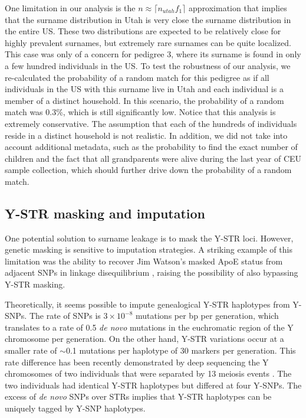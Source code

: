 One limitation in our analysis is the $n \approx \lceil n_{utah} f_1 \rceil$ approximation that implies that the surname distribution in Utah is very close the surname distribution in the entire US. These two distributions are expected to be relatively close for highly prevalent surnames, but extremely rare surnames can be quite localized. This case was only of a concern for pedigree 3, where its surname is found in only a few hundred individuals in the US. To test the robustness of our analysis, we re-calculated the probability of a random match for this pedigree as if all individuals in the US with this surname live in Utah and each individual is a member of a distinct household. In this scenario, the probability of a random match was 0.3\%, which is still significantly low. Notice that this analysis is extremely conservative. The assumption that each of the hundreds of individuals reside in a distinct household is not realistic. In addition, we did not take into account additional metadata, such as the probability to find the exact number of children and the fact that all grandparents were alive during the last year of CEU sample collection, which should further drive down the probability of a random match.

\subsection{Y-STR masking and imputation}
One potential solution to surname leakage is to mask the Y-STR loci. However, genetic masking is sensitive to imputation strategies. A striking example of this limitation was the ability to recover Jim Watson's masked ApoE status from adjacent SNPs in linkage disequilibrium \cite{NyholtYuVisscher2009}, raising the possibility of also bypassing Y-STR masking.

Theoretically, it seems possible to impute genealogical Y-STR haplotypes from Y-SNPs. The rate of SNPs is $3\times 10^{-8}$ mutations per bp per generation, which translates to a rate of 0.5 \emph{de novo} mutations in the euchromatic region of the Y chromosome per generation. On the other hand, Y-STR variations occur at a smaller rate of $\sim$0.1 mutations per haplotype of 30 markers per generation. This rate difference has been recently demonstrated by deep sequencing the Y chromosomes of two individuals that were separated by 13 meiosis events \cite{XueWangLongEtAl2009}. The two individuals had identical Y-STR haplotypes but differed at four Y-SNPs. The excess of \emph{de novo} SNPs over STRs implies that Y-STR haplotypes can be uniquely tagged by Y-SNP haplotypes.

